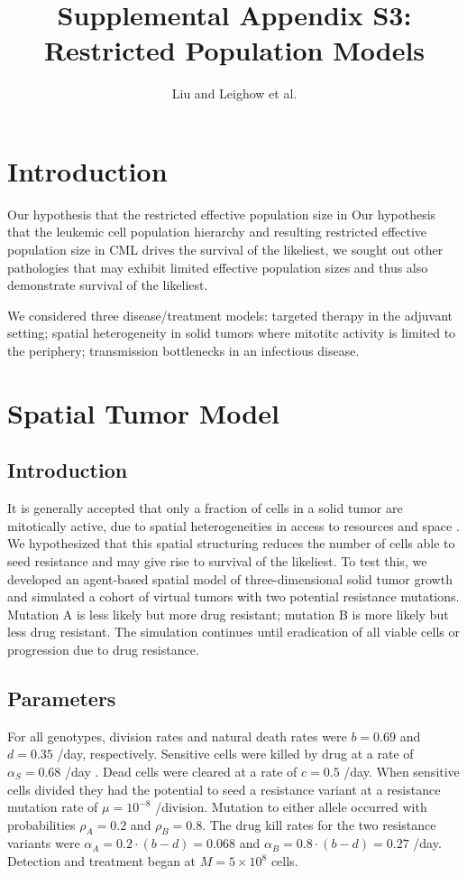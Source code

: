 \documentclass{article}
\title{Supplemental Appendix S3: \\
\large Restricted Population Models}
\author{Liu and Leighow et al.}
\begin{document}
\maketitle

\section{Introduction}
Our hypothesis that the restricted effective population size in 
Our hypothesis that the leukemic cell population hierarchy and resulting restricted effective population size in CML drives the survival of the likeliest, we sought out other pathologies that may exhibit limited effective population sizes and thus also demonstrate survival of the likeliest.

We considered three disease/treatment models: targeted therapy in the adjuvant setting; spatial heterogeneity in solid tumors where mitotitc activity is limited to the periphery; transmission bottlenecks in an infectious disease.

\section{Spatial Tumor Model}

\subsection{Introduction}
It is generally accepted that only a fraction of cells in a solid tumor are mitotically active, due to spatial heterogeneities in access to resources and space \cite{1}.  We hypothesized that this spatial structuring reduces the number of cells able to seed resistance and may give rise to survival of the likeliest.  To test this, we developed an agent-based spatial model of three-dimensional solid tumor growth and simulated a cohort of virtual tumors with two potential resistance mutations.  Mutation A is less likely but more drug resistant; mutation B is more likely but less drug resistant.  The simulation continues until eradication of all viable cells or progression due to drug resistance.

\subsection{Parameters}
For all genotypes, division rates and natural death rates were $b = 0.69$ and $d = 0.35$ /day, respectively.  Sensitive cells were killed by drug at a rate of $\alpha_S = 0.68$ /day \cite{2}.  Dead cells were cleared at a rate of $c=0.5$ /day.  When sensitive cells divided they had the potential to seed a resistance variant at a resistance mutation rate of $\mu=10^{-8}$ /division.  Mutation to either allele occurred with probabilities $\rho_A=0.2$ and $\rho_B=0.8$.  The drug kill rates for the two resistance variants were $\alpha_A=0.2\cdot(b-d)=0.068$ and $\alpha_B=0.8\cdot(b-d)=0.27$ /day.  Detection and treatment began at $M=5\times10^8$ cells.
\end{document}
